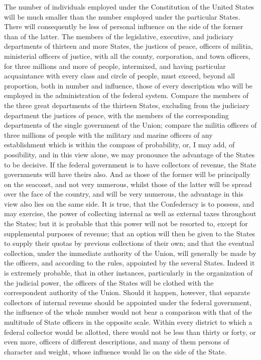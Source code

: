 The number of individuals employed under the Constitution of the United States will be much smaller than the number employed under the particular States. 
There will consequently be less of personal influence on the side of the former than of the latter. 
The members of the legislative, executive, and judiciary departments of thirteen and more States, the justices of peace, officers of militia, ministerial officers of justice, with all the county, corporation, and town officers, for three millions and more of people, intermixed, and having particular acquaintance with every class and circle of people, must exceed, beyond all proportion, both in number and influence, those of every description who will be employed in the administration of the federal system. 
Compare the members of the three great departments of the thirteen States, excluding from the judiciary department the justices of peace, with the members of the corresponding departments of the single government of the Union; compare the militia officers of three millions of people with the military and marine officers of any establishment which is within the compass of probability, or, I may add, of possibility, and in this view alone, we may pronounce the advantage of the States to be decisive. 
If the federal government is to have collectors of revenue, the State governments will have theirs also. 
And as those of the former will be principally on the seacoast, and not very numerous, whilst those of the latter will be spread over the face of the country, and will be very numerous, the advantage in this view also lies on the same side. 
It is true, that the Confederacy is to possess, and may exercise, the power of collecting internal as well as external taxes throughout the States; but it is probable that this power will not be resorted to, except for supplemental purposes of revenue; that an option will then be given to the States to supply their quotas by previous collections of their own; and that the eventual collection, under the immediate authority of the Union, will generally be made by the officers, and according to the rules, appointed by the several States. 
Indeed it is extremely probable, that in other instances, particularly in the organization of the judicial power, the officers of the States will be clothed with the correspondent authority of the Union. 
Should it happen, however, that separate collectors of internal revenue should be appointed under the federal government, the influence of the whole number would not bear a comparison with that of the multitude of State officers in the opposite scale. 
Within every district to which a federal collector would be allotted, there would not be less than thirty or forty, or even more, officers of different descriptions, and many of them persons of character and weight, whose influence would lie on the side of the State.

